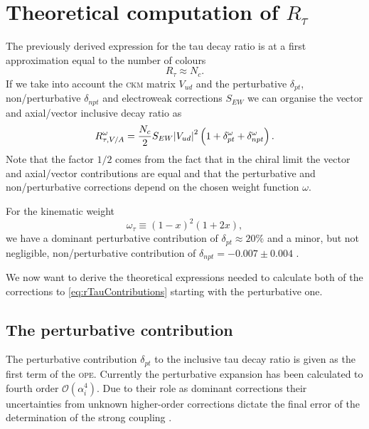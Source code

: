 \documentclass[../../index.tex]{subfiles}
\begin{document}
\section{Theoretical computation of \(R_\tau\)}
The previously derived expression for the tau decay ratio is at a first
approximation equal to the number of colours \cite{Peskin1995}
\begin{equation}
  R_\tau \approx N_c.
\end{equation} 
If we take into account the \textsc{ckm} matrix
\(V_{ud}\) and the perturbative \(\delta_{pt}\), non\-/perturbative
\(\delta_{npt}\) and electroweak corrections \(S_{EW}\) we can organise the
vector and axial\-/vector inclusive decay ratio as
\begin{equation}
  \label{eq:rTauContributions}
  R_{\tau,V/A}^\omega = \frac{N_c}{2}S_{EW} \abs{V_{ud}}^2 \left( 1 + \delta_{pt}^{\omega} + \delta_{npt}^{\omega} \right).
\end{equation}
Note that the factor \(1/2\) comes from the fact that in the chiral limit the
vector and axial\-/vector contributions are equal and that the perturbative and
non\-/perturbative corrections depend on the chosen weight function \(\omega\).

For the kinematic weight
\begin{equation}
  \omega_\tau \equiv (1-x)^2(1+2x),
\end{equation}
we have a dominant perturbative contribution of \(\delta_{pt} \approx 20\%\)
\cite{Pich2013} and a minor, but not negligible, non\-/perturbative contribution
of \(\delta_{npt} = -0.007 \pm 0.004\) \cite{Braaten1991}.

We now want to derive the theoretical expressions needed to calculate both of
the corrections to \cref{eq:rTauContributions} starting with the perturbative
one.


\subsection{The perturbative contribution}
The perturbative contribution \(\delta_{pt}\) to the inclusive tau decay ratio
is given as the first term of the \textsc{ope}. Currently the perturbative
expansion has been calculated to fourth order \(\mathcal{O}(\alpha_i^4)\). Due
to their role as dominant corrections their uncertainties from unknown
higher-order corrections dictate the final error of the determination of the
strong coupling \cite{Pich2016}.
\end{document}
